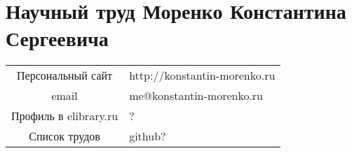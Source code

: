 \documentclass[onecolumn]{article}
\begin{document}
\section*{Научный труд Моренко Константина Сергеевича}

\center{\today}
\begin{tabular}{c l}
  Персональный сайт & http://konstantin-morenko.ru \\
  email & me@konstantin-morenko.ru \\
  Профиль в elibrary.ru & ? \\
  Список трудов & github? \\
\end{tabular}

\nocite{*} %
\printbibliography[heading=none,keyword={konstantin-morenko}]
\end{document}
